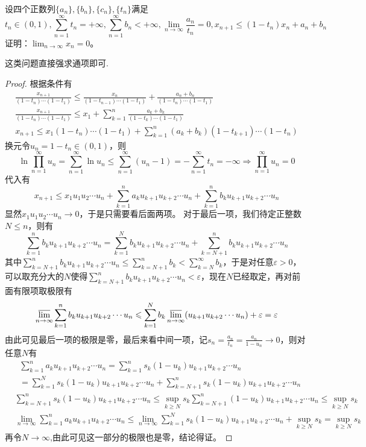 \documentclass[../../main.tex]{subfiles}
\begin{document}
\begin{example}
设四个正数列\(\{a_n\},\{b_n\},\{c_n\},\{t_n\}\)满足
\[t_n\in(0,1),\sum_{n = 1}^{\infty}t_n=+\infty,\sum_{n = 1}^{\infty}b_n<+\infty,\lim_{n\rightarrow\infty}\frac{a_n}{t_n}=0,x_{n + 1}\leqslant (1 - t_n)x_n+a_n + b_n\]
证明：\(\lim_{n\rightarrow\infty}x_n = 0\)。
\end{example}
\begin{note}
这类问题直接强求通项即可.
\end{note}
\begin{proof}
根据条件有
\begin{gather*}
\frac{x_{n + 1}}{(1 - t_n)\cdots(1 - t_1)}\leqslant \frac{x_n}{(1 - t_{n-1})\cdots(1 - t_1)}+\frac{a_n + b_n}{(1 - t_n)\cdots(1 - t_1)}\\
\frac{x_{n + 1}}{(1 - t_n)\cdots(1 - t_1)}\leqslant  x_1+\sum_{k = 1}^{n}\frac{a_k + b_k}{(1 - t_k)\cdots(1 - t_1)}\\
x_{n + 1}\leqslant  x_1(1 - t_n)\cdots(1 - t_1)+\sum_{k = 1}^{n}(a_k + b_k)(1 - t_{k + 1})\cdots(1 - t_n)
\end{gather*}
换元令\(u_n = 1 - t_n\in(0,1)\)，则
\[\ln\prod_{n = 1}^{\infty}u_n=\sum_{n = 1}^{\infty}\ln u_n\leqslant \sum_{n = 1}^{\infty}(u_n - 1)=-\sum_{n = 1}^{\infty}t_n=-\infty\Rightarrow\prod_{n = 1}^{\infty}u_n = 0\]
代入有
\[x_{n + 1}\leqslant  x_1u_1u_2\cdots u_n+\sum_{k = 1}^{n}a_ku_{k + 1}u_{k + 2}\cdots u_n+\sum_{k = 1}^{n}b_ku_{k + 1}u_{k + 2}\cdots u_n\]
显然\(x_1u_1u_2\cdots u_n\rightarrow0\)，于是只需要看后面两项。
对于最后一项，我们待定正整数\(N\leqslant  n\)，则有
\[\sum_{k = 1}^{n}b_ku_{k + 1}u_{k + 2}\cdots u_n=\sum_{k = 1}^{N}b_ku_{k + 1}u_{k + 2}\cdots u_n+\sum_{k = N + 1}^{n}b_ku_{k + 1}u_{k + 2}\cdots u_n\]
其中\(\sum_{k = N + 1}^{n}b_ku_{k + 1}u_{k + 2}\cdots u_n\leqslant \sum_{k = N + 1}^{n}b_k<\sum_{k = N}^{\infty}b_k\)，于是对任意\(\varepsilon>0\)，可以取充分大的\(N\)使得\(\sum_{k = N + 1}^{n}b_ku_{k + 1}u_{k + 2}\cdots u_n<\varepsilon\)，现在\(N\)已经取定，再对前面有限项取极限有
\[\varlimsup_{n\rightarrow\infty}\sum_{k = 1}^{n}b_ku_{k + 1}u_{k + 2}\cdots u_n\leqslant \sum_{k = 1}^{N}b_k\varlimsup_{n\rightarrow\infty}(u_{k + 1}u_{k + 2}\cdots u_n)+\varepsilon=\varepsilon\]
由此可见最后一项的极限是零，最后来看中间一项，记\(s_n=\frac{a_n}{t_n}=\frac{a_n}{1 - u_n}\rightarrow0\)，则对任意\(N\)有
\begin{align*}
&\sum_{k = 1}^{n}a_ku_{k + 1}u_{k + 2}\cdots u_n=\sum_{k = 1}^{n}s_k(1 - u_k)u_{k + 1}u_{k + 2}\cdots u_n\\
&=\sum_{k = 1}^{N}s_k(1 - u_k)u_{k + 1}u_{k + 2}\cdots u_n+\sum_{k = N + 1}^{n}s_k(1 - u_k)u_{k + 1}u_{k + 2}\cdots u_n
\end{align*}
\begin{align*}
&\sum_{k = N + 1}^{n}s_k(1 - u_k)u_{k + 1}u_{k + 2}\cdots u_n\leqslant \sup_{k\geqslant  N}s_k\sum_{k = N + 1}^{n}(1 - u_k)u_{k + 1}u_{k + 2}\cdots u_n\leqslant \sup_{k\geqslant  N}s_k\\
&\lim_{n\rightarrow\infty}\sum_{k = 1}^{n}a_ku_{k + 1}u_{k + 2}\cdots u_n\leqslant \lim_{n\rightarrow\infty}\sum_{k = 1}^{N}s_k(1 - u_k)u_{k + 1}u_{k + 2}\cdots u_n+\sup_{k\geqslant  N}s_k=\sup_{k\geqslant  N}s_k
\end{align*}
再令$N\to \infty$,由此可见这一部分的极限也是零，结论得证。

\end{proof}
\end{document}
